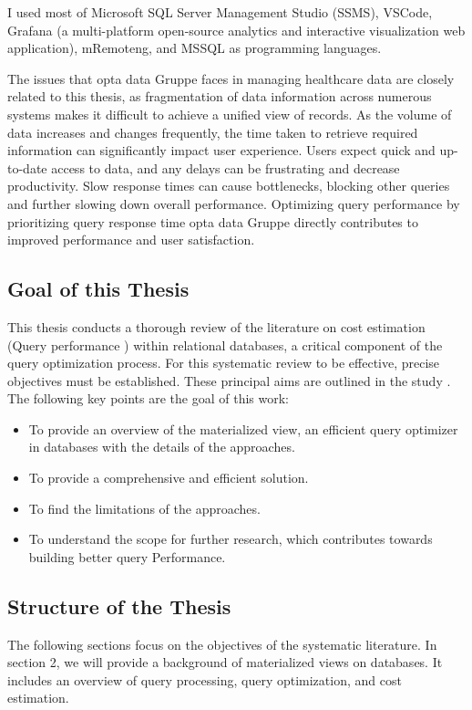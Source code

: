 I used most of Microsoft SQL Server Management Studio (SSMS), VSCode, Grafana (a multi-platform open-source analytics and interactive visualization web application), mRemoteng, and MSSQL as programming languages.\vspace{.4cm}

The issues that opta data Gruppe faces in managing healthcare data are closely related to this thesis, as fragmentation of data information across numerous systems makes it difficult to achieve a unified view of records. As the volume of data increases and changes frequently, the time taken to retrieve required information can significantly impact user experience. Users expect quick and up-to-date access to data, and any delays can be frustrating and decrease productivity. Slow response times can cause bottlenecks, blocking other queries and further slowing down overall performance. Optimizing query performance by prioritizing query response time opta data Gruppe directly contributes to improved performance and user satisfaction.

\subsection{Goal of this Thesis}
\normalsize
This thesis conducts a thorough review of the literature on cost estimation (Query performance ) within relational databases, a critical component of the query optimization process. For this systematic review to be effective, precise objectives must be established. These principal aims are outlined in the study \cite{CostEstimation}. The following key points are the goal of this work: 
\begin{itemize}
  \item To provide an overview of the materialized view, an efficient query optimizer in databases with the details of the approaches.
  \item To provide a comprehensive and efficient solution.
  \item To find the limitations of the approaches.
  \item To understand the scope for further research, which contributes towards building
better query Performance. %
\end{itemize}
\subsection{Structure of the Thesis }
The following sections focus on the objectives of the systematic literature. In section 2, we will provide a background of materialized views on databases. It includes an overview of query processing, query optimization, and cost estimation.\vspace{.4cm}

